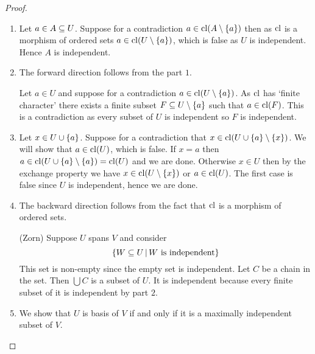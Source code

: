\begin{proof}~
    \begin{enumerate}
        \item Let $a \in A \subseteq U$. 
        Suppose for a contradiction 
        $a \in \operatorname{cl}(A \setminus \left\{a\right\})$ then as $\operatorname{cl}$ is a morphism of 
        ordered sets $a \in \operatorname{cl}(U \setminus \left\{a\right\})$, 
        which is false as $U$ is independent.
        Hence $A$ is independent.
        \item The forward direction follows from the part $1$. 
        
        \begin{backward}
            Let $a \in U$ and suppose for a contradiction 
            $a \in \operatorname{cl}(U \setminus \left\{a\right\})$. 
            As $\operatorname{cl}$ has `finite character' there exists a finite subset 
            $F \subseteq U \setminus \left\{a\right\}$ such that $a \in \operatorname{cl}(F)$.
            This is a contradiction as every subset of $U$ is independent
            so $F$ is independent.
        \end{backward}

        \item Let $x \in U \cup \left\{a\right\}$.
        Suppose for a contradiction that 
        $x \in \operatorname{cl}(U \cup \left\{a\right\} \setminus \left\{x\right\})$.
        We will show that $a \in \operatorname{cl}(U)$, which is false.
        If $x = a$ then $a \in \operatorname{cl}(U \cup \left\{a\right\} \setminus \left\{a\right\}) = \operatorname{cl}(U)$
        and we are done.
        Otherwise $x \in U$ then by the exchange property
        we have $x \in \operatorname{cl}(U \setminus \left\{x\right\})$ or $a \in \operatorname{cl}(U)$.
        The first case is false since $U$ is independent,
        hence we are done.

        \item The backward direction follows from the fact that 
        $\operatorname{cl}$ is a morphism of ordered sets.

        \begin{forward}(Zorn)
            Suppose $U$ spans $V$ and consider 
            \[\left\{W \subseteq U \,|\, W \text{ is independent}\right\}\]
            This set is non-empty since the empty set is independent.
            Let $C$ be a chain in the set. 
            Then $\bigcup C$ is a subset of $U$.
            It is independent because every finite subset of it is independent
            by part $2$.
        \end{forward}
        \item We show that $U$ is basis of $V$ if and only if it is a 
            maximally independent subset of $V$.


\end{enumerate}
\end{proof}

